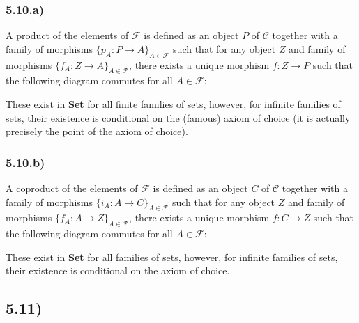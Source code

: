 \documentclass[12pt, letterpaper, twoside]{report}
\begin{document}
\subsubsection*{5.10.a)}

A product of the elements of $\mathcal{F}$ is defined as an object $P$ of $\mathcal{C}$ together with a family of morphisms $\{p_A : P \to A\}_{A \in \mathcal{F}}$ such that for any object $Z$ and family of morphisms $\{f_A : Z \to A\}_{A \in \mathcal{F}}$, there exists a unique morphism $f : Z \to P$ such that the following diagram commutes for all $A \in \mathcal{F}$:


These exist in \textbf{Set} for all finite families of sets, however, for infinite families of sets, their existence is conditional on the (famous) axiom of choice (it is actually precisely the point of the axiom of choice).

\subsubsection*{5.10.b)}

A coproduct of the elements of $\mathcal{F}$ is defined as an object $C$ of $\mathcal{C}$ together with a family of morphisms $\{i_A : A \to C\}_{A \in \mathcal{F}}$ such that for any object $Z$ and family of morphisms $\{f_A : A \to Z\}_{A \in \mathcal{F}}$, there exists a unique morphism $f : C \to Z$ such that the following diagram commutes for all $A \in \mathcal{F}$:


These exist in \textbf{Set} for all families of sets, however, for infinite families of sets, their existence is conditional on the axiom of choice.






\subsection*{5.11)}
\end{document}

